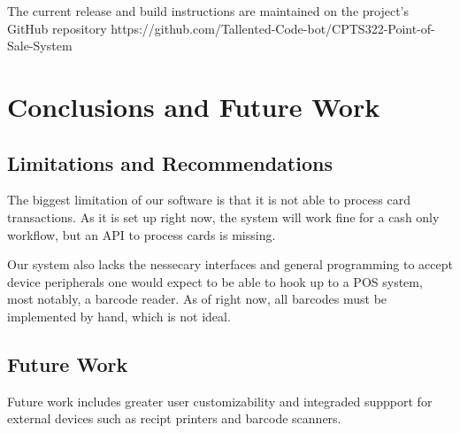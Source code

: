 The current release and build instructions are maintained on the project's
GitHub repository https://github.com/Tallented-Code-bot/CPTS322-Point-of-Sale-System

\section{Conclusions and Future Work}

\subsection{Limitations and
Recommendations}





The biggest limitation of our software is that it is not able to process card transactions.
As it is set up right now, the system will work fine for a cash only workflow, but an API to process
cards is missing.\par
Our system also lacks the nessecary interfaces and general programming to accept device peripherals
one would expect to be able to hook up to a POS system, most notably, a barcode reader. As of right now,
all barcodes must be implemented by hand, which is not ideal.

\subsection{Future Work}


Future work includes greater user customizability and integraded suppport for
external devices such as recipt printers and barcode scanners.

